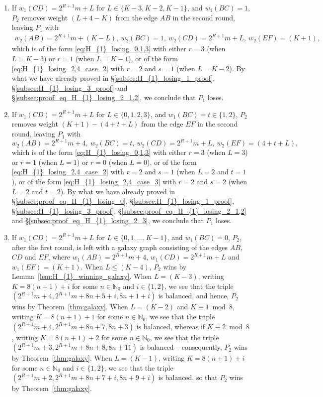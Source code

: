 \documentclass[11pt,reqno]{amsart}
\theoremstyle{definition}
\theoremstyle{definition}
\begin{document}
\begin{enumerate}
\begin{enumerate}
\item If $w_{1}(CD)=2^{R+1}m+L$ for $L \in \{K-3,K-2,K-1\}$, and $w_{1}(BC)=1$, $P_{2}$ removes weight $(L+4-K)$ from the edge $AB$ in the second round, leaving $P_{1}$ with
\begin{align}
w_{2}(AB)=2^{R+1}m+(K-L),\ w_{2}(BC)=1,\ w_{2}(CD)=2^{R+1}m+L,\ w_{2}(EF)=(K+1),\nonumber
\end{align}
which is of the form \eqref{eq:H_{1}_losing_0,1,3} with either $r=3$ (when $L=K-3$) or $r=1$ (when $L=K-1$), or of the form \eqref{eq:H_{1}_losing_2,4_case_2} with $r=2$ and $s=1$ (when $L=K-2$). By what we have already proved in \S\ref{subsec:H_{1}_losing_1_proof}, \S\ref{subsec:H_{1}_losing_3_proof} and \S\ref{subsec:proof_eq_H_{1}_losing_2_1,2}, we conclude that $P_{1}$ loses.

\item If $w_{1}(CD)=2^{R+1}m+L$ for $L \in \{0,1,2,3\}$, and $w_{1}(BC)=t\in\{1,2\}$, $P_{2}$ removes weight $(K+1)-(4+t+L)$ from the edge $EF$ in the second round, leaving $P_{1}$ with
\begin{equation}
w_{2}(AB)=2^{R+1}m+4,\ w_{2}(BC)=t,\ w_{2}(CD)=2^{R+1}m+L,\ w_{2}(EF)=(4+t+L),\nonumber
\end{equation}
which is of the form \eqref{eq:H_{1}_losing_0,1,3} with either $r=3$ (when $L=3$) or $r=1$ (when $L=1$) or $r=0$ (when $L=0$), or of the form \eqref{eq:H_{1}_losing_2,4_case_2} with $r=2$ and $s=1$ (when $L=2$ and $t=1$), or of the form \eqref{eq:H_{1}_losing_2,4_case_3} with $r=2$ and $s=2$ (when $L=2$ and $t=2$). By what we have already proved in \S\ref{subsec:proof_eq_H_{1}_losing_0}, \S\ref{subsec:H_{1}_losing_1_proof}, \S\ref{subsec:H_{1}_losing_3_proof}, \S\ref{subsec:proof_eq_H_{1}_losing_2_1,2} and \S\ref{subsec:proof_eq_H_{1}_losing_2_3}, we conclude that $P_{1}$ loses.

\item If $w_{1}(CD)=2^{R+1}m+L$ for $L \in \{0,1,\ldots,K-1\}$, and $w_{1}(BC)=0$, $P_{2}$, after the first round, is left with a galaxy graph consisting of the edges $AB$, $CD$ and $EF$, where $w_{1}(AB)=2^{R+1}m+4$, $w_{1}(CD)=2^{R+1}m+L$ and $w_{1}(EF)=(K+1)$. When $L\leqslant(K-4)$, $P_{2}$ wins by Lemma~\ref{lem:H_{1}_winning_galaxy}. When $L=(K-3)$, writing $K=8(n+1)+i$ for some $n\in\mathbb{N}_{0}$ and $i\in\{1,2\}$, we see that the triple $\left(2^{R+1}m+4,2^{R+1}m+8n+5+i,8n+1+i\right)$ is balanced, and hence, $P_{2}$ wins by Theorem~\ref{thm:galaxy}. When $L=(K-2)$ and $K \equiv 1 \bmod 8$, writing $K=8(n+1)+1$ for some $n \in \mathbb{N}_{0}$, we see that the triple $\left(2^{R+1}m+4,2^{R+1}m+8n+7,8n+3\right)$ is balanced, whereas if $K\equiv 2\bmod 8$, writing $K=8(n+1)+2$ for some $n\in\mathbb{N}_{0}$, we see that the triple $\left(2^{R+1}m+3,2^{R+1}m+8n+8,8n+11\right)$ is balanced -- consequently, $P_{2}$ wins by Theorem~\ref{thm:galaxy}. When $L=(K-1)$, writing $K=8(n+1)+i$ for some $n\in\mathbb{N}_{0}$ and $i\in\{1,2\}$, we see that the triple $\left(2^{R+1}m+2,2^{R+1}m+8n+7+i,8n+9+i\right)$ is balanced, so that $P_{2}$ wins by Theorem~\ref{thm:galaxy}.


\end{enumerate}
\end{enumerate}
\end{document}
